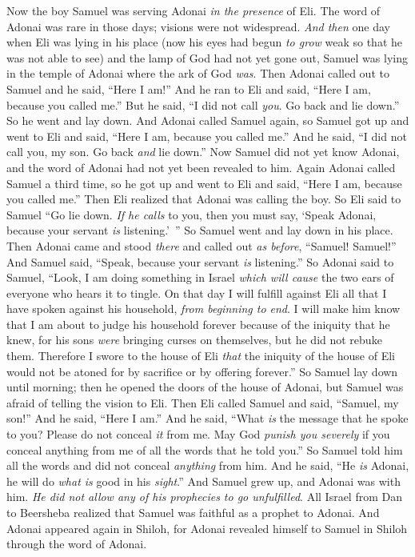 \begin{biblechapter} %
 Now the boy Samuel was serving Adonai \textit{in the presence} of Eli. The word of Adonai was rare in those days; visions were not widespread.
\verse \textit{And then} one day when Eli was lying in his place (now his eyes had begun \textit{to grow} weak so that he was not able to see)
\verse and the lamp of God had not yet gone out, Samuel was lying in the temple of Adonai where the ark of God \textit{was}.
\verse Then Adonai called out to Samuel and he said, “Here I am!”
\verse And he ran to Eli and said, “Here I am, because you called me.” But he said, “I did not call \textit{you}. Go back and lie down.” So he went and lay down.
\verse And Adonai called Samuel again, so Samuel got up and went to Eli and said, “Here I am, because you called me.” And he said, “I did not call you, my son. Go back \textit{and} lie down.”
\verse Now Samuel did not yet know Adonai, and the word of Adonai had not yet been revealed to him.
\verse Again Adonai called Samuel a third time, so he got up and went to Eli and said, “Here I am, because you called me.” Then Eli realized that Adonai was calling the boy.
\verse So Eli said to Samuel “Go lie down. \textit{If he calls} to you, then you must say, ‘Speak Adonai, because your servant \textit{is} listening.’ ” So Samuel went and lay down in his place.
\verse Then Adonai came and stood \textit{there} and called out \textit{as before}, “Samuel! Samuel!” And Samuel said, “Speak, because your servant \textit{is} listening.”
\verse So Adonai said to Samuel, “Look, I am doing something in Israel \textit{which will cause} the two ears of everyone who hears it to tingle.
\verse On that day I will fulfill against Eli all that I have spoken against his household, \textit{from beginning to end}.
\verse I will make him know that I am about to judge his household forever because of the iniquity that he knew, for his sons \textit{were} bringing curses on themselves, but he did not rebuke them.
\verse Therefore I swore to the house of Eli \textit{that} the iniquity of the house of Eli would not be atoned for by sacrifice or by offering forever.”
\verse So Samuel lay down until morning; then he opened the doors of the house of Adonai, but Samuel was afraid of telling the vision to Eli.
\verse Then Eli called Samuel and said, “Samuel, my son!” And he said, “Here I am.”
\verse And he said, “What \textit{is} the message that he spoke to you? Please do not conceal \textit{it} from me. May God \textit{punish you severely} if you conceal anything from me of all the words that he told you.”
\verse So Samuel told him all the words and did not conceal \textit{anything} from him. And he said, “He \textit{is} Adonai, he will do \textit{what is} good in his \textit{sight}.”
\verse And Samuel grew up, and Adonai was with him. \textit{He did not allow any of his prophecies to go unfulfilled}.
\verse All Israel from Dan to Beersheba realized that Samuel was faithful as a prophet to Adonai.
\verse And Adonai appeared again in Shiloh, for Adonai revealed himself to Samuel in Shiloh through the word of Adonai.
\end{biblechapter}

